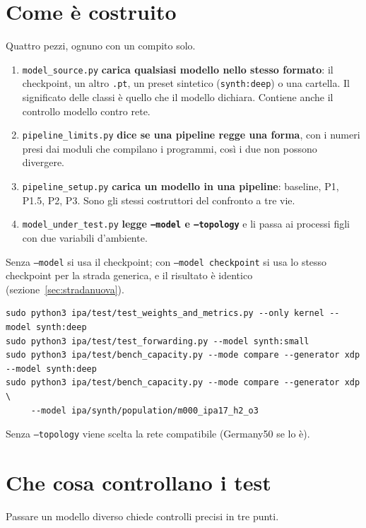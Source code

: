 \documentclass[11pt,a4paper,oneside]{report}
\begin{document}
\section{Come è costruito}

Quattro pezzi, ognuno con un compito solo.

\begin{enumerate}
  \item \texttt{model\_source.py} \textbf{carica qualsiasi modello nello stesso
        formato}: il checkpoint, un altro \texttt{.pt}, un preset sintetico
        (\texttt{synth:deep}) o una cartella. Il significato delle classi è
        quello che il modello dichiara. Contiene anche il controllo modello
        contro rete.
  \item \texttt{pipeline\_limits.py} \textbf{dice se una pipeline regge una
        forma}, con i numeri presi dai moduli che compilano i programmi, così i
        due non possono divergere.
  \item \texttt{pipeline\_setup.py} \textbf{carica un modello in una pipeline}:
        baseline, P1, P1.5, P2, P3. Sono gli stessi costruttori del confronto a
        tre vie.
  \item \texttt{model\_under\_test.py} \textbf{legge \texttt{--model} e
        \texttt{--topology}} e li passa ai processi figli con due variabili
        d'ambiente.
\end{enumerate}

Senza \texttt{--model} si usa il checkpoint; con \texttt{--model checkpoint} si
usa lo stesso checkpoint per la strada generica, e il risultato è identico
(sezione~\ref{sec:stradanuova}).

\begin{lstlisting}
sudo python3 ipa/test/test_weights_and_metrics.py --only kernel --model synth:deep
sudo python3 ipa/test/test_forwarding.py --model synth:small
sudo python3 ipa/test/bench_capacity.py --mode compare --generator xdp --model synth:deep
sudo python3 ipa/test/bench_capacity.py --mode compare --generator xdp \
     --model ipa/synth/population/m000_ipa17_h2_o3
\end{lstlisting}
Senza \texttt{--topology} viene scelta la rete compatibile (Germany50 se lo è).

\section{Che cosa controllano i test}

Passare un modello diverso chiede controlli precisi in tre punti.
\end{document}
